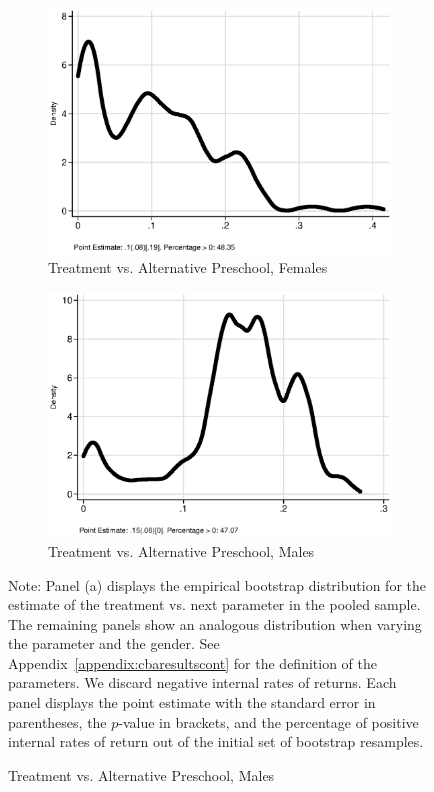 \begin{figure}
\begin{subfigure}[h]{0.25\textwidth}
\end{subfigure}%
\begin{subfigure}[h]{0.25\textwidth}
	\centering
	\caption{Treatment vs. Alternative Preschool, Females}
		\includegraphics[width=\textwidth]{output/irr_8_sexf.eps}
\end{subfigure}%
\begin{subfigure}[h]{0.25\textwidth}
	\centering
	\caption{Treatment vs. Alternative Preschool, Males}
		\includegraphics[width=\textwidth]{output/irr_8_sexm.eps}
\end{subfigure}
\footnotesize \justify
Note: Panel (a) displays the empirical bootstrap distribution for the estimate of the treatment vs. next parameter in the pooled sample. The remaining panels show an analogous distribution when varying the parameter and the gender. See Appendix~\ref{appendix:cbaresultscont} for the definition of the parameters. We discard negative internal rates of returns. Each panel displays the point estimate with the standard error in parentheses, the $p$-value in brackets, and the percentage of positive internal rates of return out of the initial set of bootstrap resamples.
\end{figure}
\restoregeometry
\doublespacing




